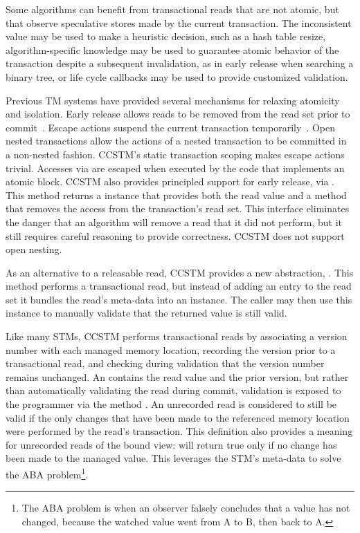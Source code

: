 Some algorithms can benefit from transactional reads that are not atomic,
but that observe speculative stores made by the current transaction.
The inconsistent value may be used to make a heuristic decision, such as a
hash table resize, algorithm-specific knowledge may be used to guarantee
atomic behavior of the transaction despite a subsequent invalidation,
as in early release when searching a binary tree, or life cycle callbacks
may be used to provide customized validation.

Previous TM systems have provided several mechanisms for relaxing
atomicity and isolation.  Early release allows reads to be removed
from the read set prior to commit~\cite{HerlihyLMS03}.  Escape actions
suspend the current transaction temporarily~\cite{harris04exceptions}.
Open nested transactions allow the actions of a nested transaction
to be committed in a non-nested fashion.  CCSTM's static transaction
scoping makes escape actions trivial.  Accesses via 
are escaped when executed by the code that implements an atomic
block. CCSTM also provides principled support for early release,
via .  This method returns a
 instance that provides both the read value and
a method that removes the access from the transaction's read set.
This interface eliminates the danger that an algorithm will remove a
read that it did not perform, but it still requires careful reasoning
to provide correctness.  CCSTM does not support open nesting.

As an alternative to a releasable read, CCSTM provides a new
abstraction, .  This method performs a
transactional read, but instead of adding an entry to the read set it
bundles the read's meta-data into an  instance.
The caller may then use this instance to manually validate that the
returned value is still valid.

Like many STMs, CCSTM performs transactional reads by associating a
version number with each managed memory location, recording the version
prior to a transactional read, and checking during validation that the
version number remains unchanged.  An  contains the
read value and the prior version, but rather than automatically validating
the read during commit, validation is exposed to the programmer via the
method .  An unrecorded read is considered to still be
valid if the only changes that have been made to the referenced memory
location were performed by the read's transaction.  This definition also
provides a meaning for unrecorded reads of the  bound view:
 will return true only if no change has been made to the
managed value.  This leverages the STM's meta-data to solve
the ABA problem\footnote{The ABA problem is when an observer falsely
concludes that a value has not changed, because the watched value went
from A to B, then back to A.}.

